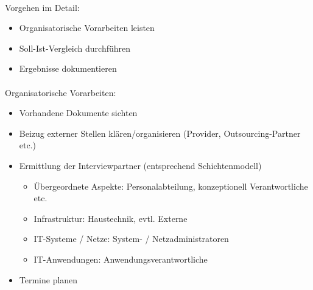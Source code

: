 \documentclass[10pt,a4paper]{article}
\begin{document}
\paragraph*{}Vorgehen im Detail:
\begin{itemize}[noitemsep,topsep=0pt,leftmargin=*]
    \item Organisatorische Vorarbeiten leisten
    \item Soll-Ist-Vergleich durchführen
    \item Ergebnisse dokumentieren
\end{itemize}

\paragraph*{}Organisatorische Vorarbeiten:
\begin{itemize}[noitemsep,topsep=0pt,leftmargin=*]
    \item Vorhandene Dokumente sichten
    \item Beizug externer Stellen klären/organisieren (Provider,
    Outsourcing-Partner etc.)
    \item Ermittlung der Interviewpartner (entsprechend
    Schichtenmodell)
    \begin{itemize}[noitemsep,topsep=0pt,leftmargin=*]
        \item Übergeordnete Aspekte: Personalabteilung,
        konzeptionell Verantwortliche etc.
        \item Infrastruktur: Haustechnik, evtl. Externe
        \item IT-Systeme / Netze: System- / Netzadministratoren
        \item IT-Anwendungen: Anwendungsverantwortliche
    \end{itemize}
    \item Termine planen
\end{itemize}
\end{document}
